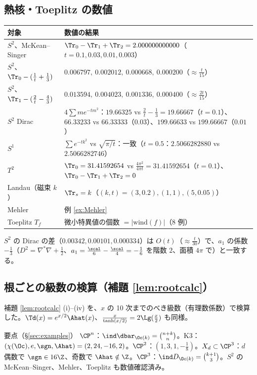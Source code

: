 \subsection{熱核・Toeplitz の数値}
\begin{center}
{\small\begin{tabular}{l|p{10.5cm}}
\toprule
対象 & 数値の結果\\
\midrule
$S^2$、McKean--Singer & $\Tr_0-\Tr_1+\Tr_2=2.000000000000$（$t=0.1,0.03,0.01,0.003$）\\
$S^2$、$\Tr_0-(\frac1t+\frac13)$ & $0.006797,\ 0.002012,\ 0.000668,\ 0.000200$（$\approx\frac t{15}$）\\
$S^2$、$\Tr_1-(\frac2t-\frac43)$ & $0.013594,\ 0.004023,\ 0.001336,\ 0.000400$（$\approx\frac{2t}{15}$）\\
$S^2$ Dirac & $4\sum me^{-tm^2}$：$19.66325$ vs $\frac2t-\frac13=19.66667$（$t=0.1$）、$66.33233$ vs $66.33333$（$0.03$）、$199.66633$ vs $199.66667$（$0.01$）\\
$S^1$ & $\sum e^{-tk^2}$ vs $\sqrt{\pi/t}$：一致（$t=0.5$：$2.5066282880$ vs $2.5066282746$）\\
$T^2$ & $\Tr_0=31.41592654$ vs $\frac{4\pi^2}{4\pi t}=31.41592654$（$t=0.1$）、$\Tr_0-\Tr_1+\Tr_2=0$\\
Landau（磁束 $k$） & $\Tr_s=k$（$(k,t)=(3,0.2),(1,1),(5,0.05)$）\\
Mehler & 例 \ref{ex:Mehler}\\
Toeplitz $T_f$ & 微小特異値の個数 $=|\mathrm{wind}(f)|$（8 例）\\
\bottomrule
\end{tabular}}
\end{center}
$S^2$ の Dirac の差（$0.00342,0.00101,0.000334$）は $O(t)$（$\approx\frac t{30}$）で、$a_1$ の係数 $-\frac13$（$D^2=\nabla^*\nabla+\frac12$、$a_1=\frac{\scal}6-\frac{\scal}4=-\frac16$ を階数 $2$、面積 $4\pi$ で）と一致する。

\subsection{根ごとの級数の検算（補題 \ref{lem:rootcalc}）}
補題 \ref{lem:rootcalc} (i)--(iv) を、$x$ の 10 次までのべき級数（有理数係数）で検算した。$\Td(x)=e^{x/2}\Ahat(x)$、$\frac x{\tanh(x/2)}=2\Lg(\frac x2)$ も同様。

\begin{keybox}{要点（\S\ref{sec:examples}）}
$\CP^n$：$\ind\dbar_{\Oc(k)}=\binom{n+k}n$。K3：$(\chi(\Oc),e,\sgn,\Ahat)=(2,24,-16,2)$。$\CP^2$：$(1,3,1,-\frac18)$。$X_d\subset\CP^3$：$d$ 偶数で $\sgn\in16\Z$、奇数で $\Ahat\notin\Z$。$\CP^3$：$\ind D_{\Oc(k)}=\binom{k+1}3$。$S^2$ の McKean--Singer、Mehler、Toeplitz も数値確認済み。
\end{keybox}
